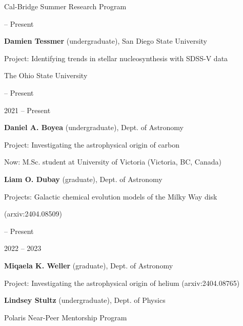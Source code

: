 \documentclass[cv.tex]{subfiles}
\begin{document}
{\color{themecolor} \large Cal-Bridge Summer Research Program}
\par\noindent
\parbox{0.18\textwidth}{%
	 -- Present \par
	\null \par
}
\hspace{1mm}
\parbox{0.8\textwidth}{%
	\vspace{1mm}
	\textbf{Damien Tessmer} (undergraduate), San Diego State University \par
	Project: Identifying trends in stellar nucleosynthesis with SDSS-V data \par
}

\vspace{5mm}
\noindent
{\color{themecolor} \large The Ohio State University}
\par\noindent
\parbox{0.18\textwidth}{%
	 -- Present \par
	\null \par
	\null \par
	2021 -- Present \par
	\null \par
	\null \par
}
\hspace{1mm}
\parbox{0.8\textwidth}{%
	\vspace{1mm}
	\textbf{Daniel A. Boyea} (undergraduate), Dept. of Astronomy \par
	Project: Investigating the astrophysical origin of carbon \par
	Now: M.Sc. student at University of Victoria (Victoria, BC, Canada) \par
	\textbf{Liam O. Dubay} (graduate), Dept. of Astronomy \par
	Projects: Galactic chemical evolution models of the Milky Way disk \par
	(arxiv:2404.08509) \par
}

\newpage
\noindent
\parbox{0.18\textwidth}{%
	 -- Present \par
	\null \par
	2022 -- 2023 \par
	\null
}
\hspace{1mm}
\parbox{0.8\textwidth}{%
	\vspace{1mm}
	\textbf{Miqaela K. Weller} (graduate), Dept. of Astronomy \par
	Project: Investigating the astrophysical origin of helium
	(arxiv:2404.08765) \par
	\textbf{Lindsey Stultz} (undergraduate), Dept. of Physics \par
	Polaris Near-Peer Mentorship Program
}
\end{document}
